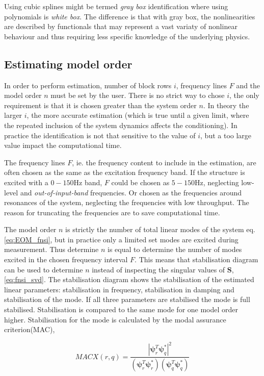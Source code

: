 Using cubic splines might be termed \textit{gray box} identification where using
polynomials is \textit{white box}. The difference is that with gray box, the
nonlinearities are described by functionals that may represent a vast variaty of
nonlinear behaviour and thus requiring less specific knowledge of the underlying
physics.


\subsection{Estimating model order}

In order to perform estimation, number of block rows $i$, frequency lines $F$
and the model order $n$ must be set by the user.
There is no strict way to chose $i$, the only requirement is that it is chosen
greater than the system order $n$. In theory the larger $i$, the more accurate
estimation (which is true until a given limit, where the repeated inclusion of
the system dynamics affects the conditioning). In practice the identification is
not that sensitive to the value of $i$, but a too large value impact the
computational time.

The frequency lines $F$, ie. the frequency content to include in the estimation,
are often chosen as the same as the excitation frequency band. If the structure
is excited with a $0-150$Hz band, $F$ could be chosen as $5-150$Hz, neglecting
low-level and \textit{out-of-input-band} frequencies. Or chosen as the
frequencies around resonances of the system, neglecting the frequencies with low
throughput. The reason for truncating the frequencies are to save computational
time.

The model order $n$ is strictly the number of total linear modes of the system
eq. \eqref{eq:EOM_fnsi}, but in practice only a limited set modes are excited
during measurement. Thus determine $n$ is equal to determine the number of modes
excited in the chosen frequency interval $F$.
This means that stabilisation diagram can be used to determine $n$ instead
of inspecting the singular values of $\bm S$, \eqref{eq:fnsi_svd}.
The stabilisation diagram shows the stabilisation of the estimated linear
parameters: stabilisation in frequency, stabilisation in damping and
stabilisation of the mode. If all three parameters are stabilised the mode is
full stabilised. Stabilisation is compared to the same mode for one model order
higher. Stabilisation for the mode is calculated by the modal assurance
criterion(MAC)\autocite{Allemang2003},

\begin{equation}
  MACX(r,q) = \frac{|\bm \psi^T_r \bm \psi^*_q|^2}
  {\left( \bm \psi^T_r \bm \psi^*_r \right)\left( \bm \psi^T_q \bm \psi^*_q \right)}
\end{equation}

